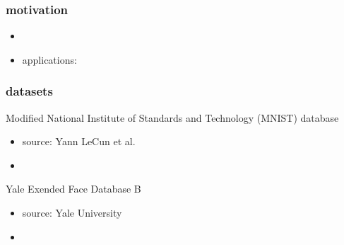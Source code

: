 \begin{frame}
\frametitle{motivation}
	
	\begin{itemize}
		\item 
		\item applications: 
	\end{itemize}

\end{frame}

\begin{frame}
\frametitle{datasets}
	
Modified National Institute of Standards and Technology (MNIST) database
	\begin{itemize}
		\setlength{\itemindent}{4em}
		\item source: Yann LeCun et al. \cite{lecun-mnisthandwrittendigit-2010}
		\item 
	\end{itemize}

        Yale Exended Face Database B
	\begin{itemize}
		\setlength{\itemindent}{4em}
		\item source: Yale University \cite{yaleB}
		\item 
	\end{itemize}


\end{frame}